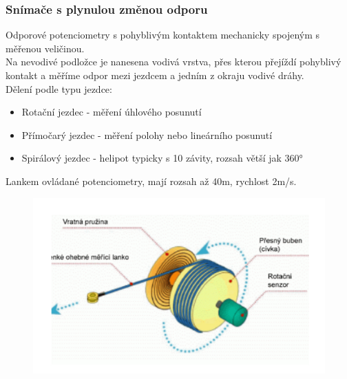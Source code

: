 \subsubsection{Snímače s plynulou změnou odporu}
Odporové potenciometry s pohyblivým kontaktem mechanicky spojeným s měřenou veličinou.\\
Na nevodivé podložce je nanesena vodivá vrstva, přes kterou přejíždí pohyblivý kontakt a měříme odpor mezi jezdcem a jedním z okraju vodivé dráhy.\\
Dělení podle typu jezdce:
\begin{itemize}
    \item Rotační jezdec - měření úhlového posunutí
    \item Přímočarý jezdec - měření polohy nebo lineárního posunutí
    \item Spirálový jezdec - helipot typicky s 10 závity, rozsah větší jak 360°
\end{itemize}
Lankem ovládané potenciometry, mají rozsah až 40m, rychlost 2m/s.
\begin{figure}[h!]
    \centering
    \includegraphics[scale = 0.1]{img/Lanko.png}
\end{figure}

